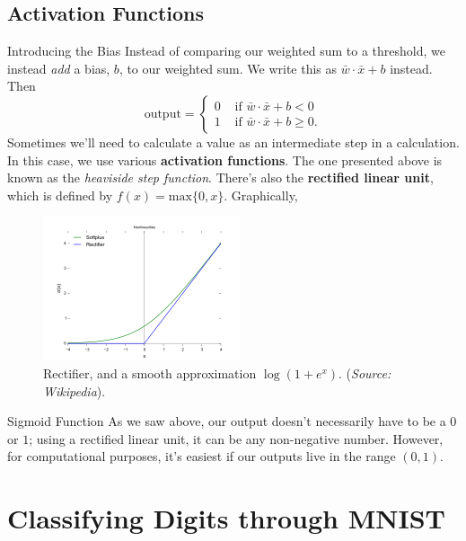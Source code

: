 \documentclass[xcolor=dvipsnames, fontsize=11pt, %
pagesize, %
parskip=half-, t]{beamer}
\begin{document}
\subsection{Activation Functions}
\begin{frame}{Introducing the Bias}
Instead of comparing our weighted sum to a threshold, we instead \textit{add} a bias, $b$, to our weighted sum. \pause We write this as $\bar{w}\cdot \bar{x}+b$ instead. \pause Then $$\text{output}=\begin{cases} 0 & \text{ if } \bar{w}\cdot \bar{x}+b<0 \\ 
1 & \text{ if } \bar{w}\cdot \bar{x}+b\ge 0. \end{cases}$$ \pause
Sometimes we'll need to calculate a value as an intermediate step in a calculation. In this case, we use various \textbf{activation functions}. \pause The one presented above is known as the \textit{heaviside step function}. There's also the \textbf{rectified linear unit}, which is defined by $f(x)=\text{max}\{0, x\}$. \pause Graphically,
\begin{figure}
\includegraphics[scale=0.42]{rectifier.png}
\caption{Rectifier, and a smooth approximation $\log(1+e^x)$. (\textit{Source: Wikipedia}).}
\end{figure}

\end{frame}

\begin{frame}{Sigmoid Function} 
As we saw above, our output doesn't necessarily have to be a $0$ or $1$; using a rectified linear unit, it can be any non-negative number. \pause However, for computational purposes, it's easiest if our outputs live in the range $(0,1)$. \pause 


\end{frame}




\section{Classifying Digits through MNIST}
\end{document}
